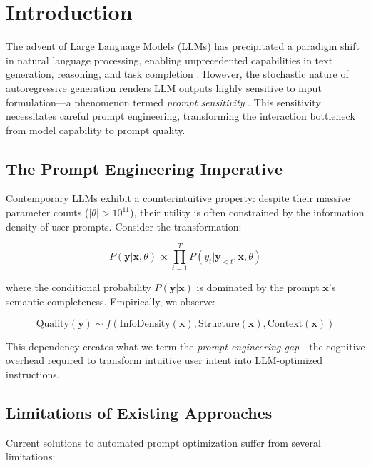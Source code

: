 \documentclass[11pt,a4paper]{article}
\begin{document}
\section{Introduction}

The advent of Large Language Models (LLMs) has precipitated a paradigm shift in natural language processing, enabling unprecedented capabilities in text generation, reasoning, and task completion \cite{brown2020gpt3, openai2023gpt4}. However, the stochastic nature of autoregressive generation renders LLM outputs highly sensitive to input formulation—a phenomenon termed \textit{prompt sensitivity} \cite{zhao2021calibrate}. This sensitivity necessitates careful prompt engineering, transforming the interaction bottleneck from model capability to prompt quality.

\subsection{The Prompt Engineering Imperative}

Contemporary LLMs exhibit a counterintuitive property: despite their massive parameter counts ($|\theta| > 10^{11}$), their utility is often constrained by the information density of user prompts. Consider the transformation:

\begin{equation}
P(\mathbf{y}|\mathbf{x}, \theta) \propto \prod_{t=1}^{T} P(y_t | \mathbf{y}_{<t}, \mathbf{x}, \theta)
\end{equation}

\noindent where the conditional probability $P(\mathbf{y}|\mathbf{x})$ is dominated by the prompt $\mathbf{x}$'s semantic completeness. Empirically, we observe:

\begin{equation}
\text{Quality}(\mathbf{y}) \sim f(\text{InfoDensity}(\mathbf{x}), \text{Structure}(\mathbf{x}), \text{Context}(\mathbf{x}))
\end{equation}

This dependency creates what we term the \textit{prompt engineering gap}—the cognitive overhead required to transform intuitive user intent into LLM-optimized instructions.

\subsection{Limitations of Existing Approaches}

Current solutions to automated prompt optimization suffer from several limitations:
\end{document}
